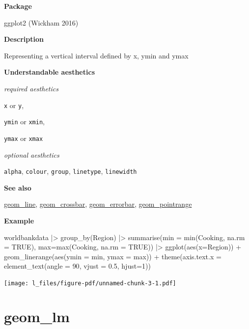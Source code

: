 \documentclass[
  letterpaper,
  DIV=11,
  numbers=noendperiod]{scrreprt}
\newenvironment{Shaded}{\begin{snugshade}}{\end{snugshade}}
\newcommand{\AttributeTok}[1]{\textcolor[rgb]{0.40,0.45,0.13}{#1}}
\newcommand{\ConstantTok}[1]{\textcolor[rgb]{0.56,0.35,0.01}{#1}}
\newcommand{\DecValTok}[1]{\textcolor[rgb]{0.68,0.00,0.00}{#1}}
\newcommand{\FloatTok}[1]{\textcolor[rgb]{0.68,0.00,0.00}{#1}}
\newcommand{\FunctionTok}[1]{\textcolor[rgb]{0.28,0.35,0.67}{#1}}
\newcommand{\NormalTok}[1]{\textcolor[rgb]{0.00,0.23,0.31}{#1}}
\newcommand{\SpecialCharTok}[1]{\textcolor[rgb]{0.37,0.37,0.37}{#1}}
\begin{document}
\textbf{Package}

ggplot2 (Wickham 2016)

\textbf{Description}

Representing a vertical interval defined by x, ymin and ymax

\textbf{Understandable aesthetics}

\emph{required aesthetics}

\texttt{x} or \texttt{y},

\texttt{ymin} or \texttt{xmin},

\texttt{ymax} or \texttt{xmax}

\emph{optional aesthetics}

\texttt{alpha}, \texttt{colour}, \texttt{group}, \texttt{linetype},
\texttt{linewidth}

\textbf{See also}

\hyperref[line]{geom\_line}, \hyperref[crossbar]{geom\_crossbar},
\hyperref[errorbar]{geom\_errorbar},
\hyperref[pointrange]{geom\_pointrange}

\textbf{Example}

\begin{Shaded}
\begin{Highlighting}[]
\NormalTok{worldbankdata }\SpecialCharTok{|\textgreater{}}
  \FunctionTok{group\_by}\NormalTok{(Region) }\SpecialCharTok{|\textgreater{}}
  \FunctionTok{summarise}\NormalTok{(}\AttributeTok{min =} \FunctionTok{min}\NormalTok{(Cooking, }\AttributeTok{na.rm =} \ConstantTok{TRUE}\NormalTok{), }\AttributeTok{max=}\FunctionTok{max}\NormalTok{(Cooking, }
                                                      \AttributeTok{na.rm =} \ConstantTok{TRUE}\NormalTok{)) }\SpecialCharTok{|\textgreater{}}
  \FunctionTok{ggplot}\NormalTok{(}\FunctionTok{aes}\NormalTok{(}\AttributeTok{x=}\NormalTok{Region)) }\SpecialCharTok{+}
  \FunctionTok{geom\_linerange}\NormalTok{(}\FunctionTok{aes}\NormalTok{(}\AttributeTok{ymin =}\NormalTok{ min, }\AttributeTok{ymax =}\NormalTok{ max)) }\SpecialCharTok{+}
  \FunctionTok{theme}\NormalTok{(}\AttributeTok{axis.text.x =} \FunctionTok{element\_text}\NormalTok{(}\AttributeTok{angle =} \DecValTok{90}\NormalTok{, }\AttributeTok{vjust =} \FloatTok{0.5}\NormalTok{, }\AttributeTok{hjust=}\DecValTok{1}\NormalTok{))}
\end{Highlighting}
\end{Shaded}

\texttt{[image: l\_files/figure-pdf/unnamed-chunk-3-1.pdf]}

\section{geom\_lm}\label{geom_lm}
\end{document}
